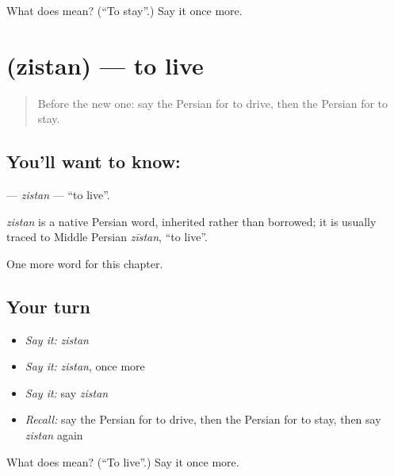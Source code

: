 \begin{tcolorbox}[breakable,colback=teal!4,colframe=teal!35!black,title={Before you move on}]
What does  mean? (\textquotedblleft{}To stay\textquotedblright{}.) Say it once more.
\end{tcolorbox}
\section[\texorpdfstring{\fa{زیستن} (zistan)}{زیستن (zistan)}]{ (zistan) — to live}

\label{lesson:FA-C135-zistan}



\begin{quote}
Before the new one: say the Persian for to drive, then the Persian for to stay.
\end{quote}

\subsection*{You'll want to know: }
\textbf{} — \emph{zistan} — \textquotedblleft{}to live\textquotedblright{}.

\begin{cousinweb}
\emph{zistan} is a native Persian word, inherited rather than borrowed; it is usually traced to Middle Persian \emph{zīstan}, \textquotedblleft{}to live\textquotedblright{}.
\end{cousinweb}

\begin{grammarlens}[title={What you've built}]
One more word for this chapter.
\end{grammarlens}

\subsection*{Your turn}
\begin{itemize}
\raggedright
  \item \emph{Say it:} \emph{zistan}
  \item \emph{Say it:} \emph{zistan}, once more
  \item \emph{Say it:} say \emph{zistan}
  \item \emph{Recall:} say the Persian for to drive, then the Persian for to stay, then say \emph{zistan} again
\end{itemize}

\begin{tcolorbox}[breakable,colback=teal!4,colframe=teal!35!black,title={Before you move on}]
What does  mean? (\textquotedblleft{}To live\textquotedblright{}.) Say it once more.
\end{tcolorbox}
